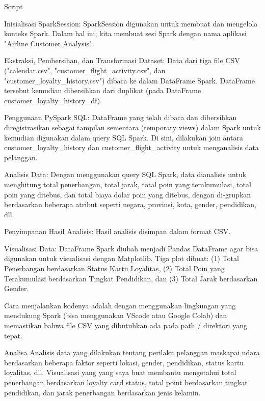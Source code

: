 Script

Inisialisasi SparkSession: SparkSession digunakan untuk membuat dan mengelola konteks Spark. Dalam hal ini, kita membuat sesi Spark dengan nama aplikasi "Airline Customer Analysis".

Ekstraksi, Pembersihan, dan Transformasi Dataset: Data dari tiga file CSV ("calendar.csv", "customer_flight_activity.csv", dan "customer_loyalty_history.csv") dibaca ke dalam DataFrame Spark. DataFrame tersebut kemudian dibersihkan dari duplikat (pada DataFrame customer_loyalty_history_df).

Penggunaan PySpark SQL: DataFrame yang telah dibaca dan dibersihkan diregistrasikan sebagai tampilan sementara (temporary views) dalam Spark untuk kemudian digunakan dalam query SQL Spark. Di sini, dilakukan join antara customer_loyalty_history dan customer_flight_activity untuk menganalisis data pelanggan.

Analisis Data: Dengan menggunakan query SQL Spark, data dianalisis untuk menghitung total penerbangan, total jarak, total poin yang terakumulasi, total poin yang ditebus, dan total biaya dolar poin yang ditebus, dengan di-grupkan berdasarkan beberapa atribut seperti negara, provinsi, kota, gender, pendidikan, dll.

Penyimpanan Hasil Analisis: Hasil analisis disimpan dalam format CSV.

Visualisasi Data: DataFrame Spark diubah menjadi Pandas DataFrame agar bisa digunakan untuk visualisasi dengan Matplotlib. Tiga plot dibuat: (1) Total Penerbangan berdasarkan Status Kartu Loyalitas, (2) Total Poin yang Terakumulasi berdasarkan Tingkat Pendidikan, dan (3) Total Jarak berdasarkan Gender.

Cara menjalankan kodenya adalah dengan menggunakan lingkungan yang mendukung Spark (bisa menggunakan VScode atau Google Colab) dan memastikan bahwa file CSV yang dibutuhkan ada pada path / direktori yang tepat.

Analisa
Analisis data yang dilakukan tentang perilaku pelanggan maskapai udara berdasarkan beberapa faktor seperti lokasi, gender, pendidikan, status kartu loyalitas, dll. Visualisasi yang yang saya buat membantu mengetahui total penerbangan berdasarkan loyalty card status, total point berdasarkan tingkat pendidikan, dan jarak penerbangan berdasarkan jenis kelamin.